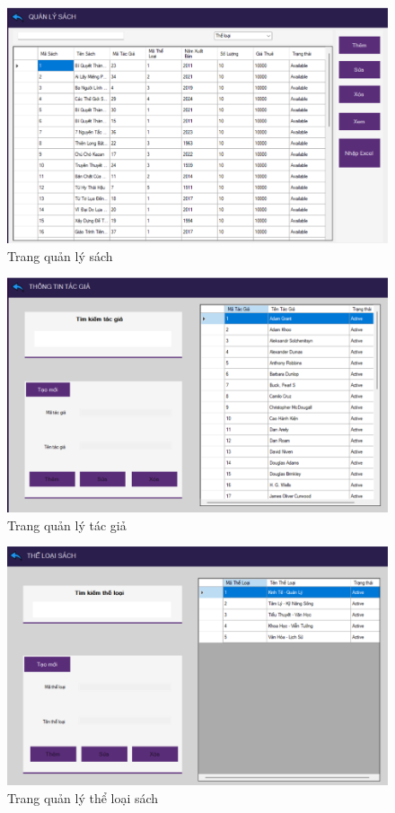 \documentclass{article}
\begin{document}
\begin{figure} [H]
    \centering
    \includegraphics[width=1\linewidth]{images//Winform/page quản lý.png}
    \caption{Trang quản lý sách}
    \label{fig:enter-label}
\end{figure}

\begin{figure} [H]
    \centering
    \includegraphics[width=1\linewidth]{images/Winform/page tác giả.png}
    \caption{Trang quản lý tác giả}
    \label{fig:enter-label}
\end{figure}

\begin{figure} [H]
    \centering
    \includegraphics[width=1\linewidth]{images//Winform/page thể loại.png}
    \caption{Trang quản lý thể loại sách}
    \label{fig:enter-label}
\end{figure}
\end{document}
